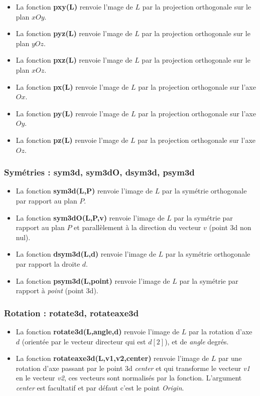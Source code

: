 \begin{itemize}
    \item La fonction \textbf{pxy(L)} renvoie l'mage de $L$ par la projection orthogonale sur le plan $xOy$.
    \item La fonction \textbf{pyz(L)} renvoie l'mage de $L$ par la projection orthogonale sur le plan $yOz$.
    \item La fonction \textbf{pxz(L)} renvoie l'mage de $L$ par la projection orthogonale sur le plan $xOz$.
\item La fonction \textbf{px(L)} renvoie l'mage de $L$ par la projection orthogonale sur l'axe $Ox$.
\item La fonction \textbf{py(L)} renvoie l'mage de $L$ par la projection orthogonale sur l'axe $Oy$.
\item La fonction \textbf{pz(L)} renvoie l'mage de $L$ par la projection orthogonale sur l'axe $Oz$.
\end{itemize}

\subsubsection{Symétries : sym3d, sym3dO, dsym3d, psym3d}

\begin{itemize}
    \item La fonction \textbf{sym3d(L,P)} renvoie l'image de $L$ par la symétrie orthogonale par rapport au plan $P$.
    \item La fonction \textbf{sym3dO(L,P,v)} renvoie l'image de $L$ par la symétrie par rapport au plan $P$ et parallèlement à la direction du vecteur $v$ (point 3d non nul).
    \item La fonction \textbf{dsym3d(L,d)} renvoie l'image de $L$ par la symétrie orthogonale par rapport la droite $d$.
    \item La fonction \textbf{psym3d(L,point)} renvoie l'image de $L$ par la symétrie par rapport à \emph{point} (point 3d).
\end{itemize}

\subsubsection{Rotation : rotate3d, rotateaxe3d}

\begin{itemize}
    \item La fonction \textbf{rotate3d(L,angle,d)} renvoie l'image de $L$ par la rotation d'axe $d$ (orientée par le vecteur directeur qui est $d[2]$), et de \emph{angle} degrés.
    \item La fonction \textbf{rotateaxe3d(L,v1,v2,center)} renvoie l'image de $L$ par une rotation d'axe passant par le point 3d \emph{center} et qui transforme le vecteur \emph{v1} en le vecteur \emph{v2}, ces vecteurs sont normalisés par la fonction. L'argument \emph{center} est facultatif et par défaut c'est le point \emph{Origin}.
\end{itemize}



